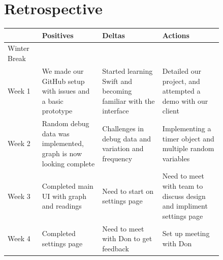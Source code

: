 \documentclass[onecolumn, draftclsnofoot,10pt, compsoc]{IEEEtran}
\begin{document}
\section{Retrospective}
\begin{center}
	\begin{longtable}{| l | p{0.28\linewidth} | p{0.28\linewidth} | p{0.28\linewidth} |}
		\hline
		& Positives & Deltas & Actions \\ \hline
    Winter Break \\ \hline
    Week 1 & We made our GitHub setup with issues and a basic prototype & Started learning Swift and becoming familiar with the interface & Detailed our project, and attempted a demo with our client \\ \hline
	Week 2 & Random debug data was implemented, graph is now looking complete & Challenges in debug data and variation and frequency & Implementing a timer object and multiple random variables \\ \hline
	Week 3 & Completed main UI with graph and readings & Need to start on settings page & Need to meet with team to discuss design and impliment settings page \\ \hline
	Week 4 & Completed settings page & Need to meet with Don to get feedback & Set up meeting with Don \\ \hline


\end{longtable}
\end{center}
\end{document}
